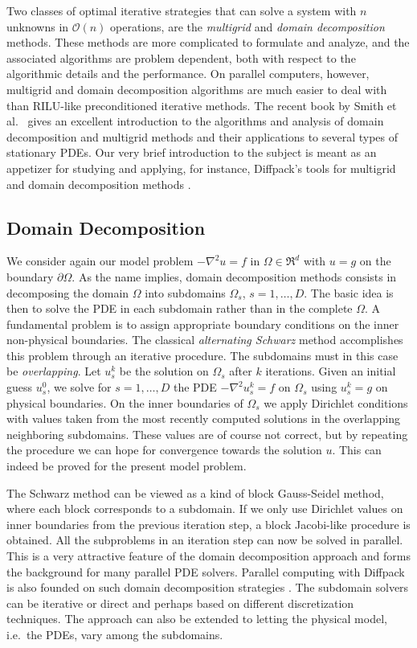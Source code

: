 Two classes of optimal iterative strategies that can solve a system with
$n$ unknowns in $\mathcal{O}(n)$ operations, are the \emph{multigrid}
and \emph{domain decomposition}
methods.
These methods are more complicated to formulate and analyze, and the
associated algorithms are problem dependent, both with respect to
the algorithmic details and the performance.
On parallel computers, however, multigrid and domain decomposition
algorithms are much easier to deal with than RILU-like preconditioned
iterative methods.
The recent book by Smith et al.~\cite{SmithBjorstadGropp96} gives
an excellent introduction to the algorithms and analysis of
domain decomposition and multigrid methods and their applications
to several types of stationary PDEs.
Our very brief introduction to the subject is meant as an appetizer for
studying \cite{SmithBjorstadGropp96} and applying, for instance, Diffpack's tools for
multigrid and domain decomposition methods \cite{DD9}.

\subsection{Domain Decomposition}
We consider again our model problem $-\nabla^2u =f$ in $\Omega\in\Re^d$
with $u=g$ on the boundary $\partial\Omega$.
As the name implies, domain decomposition methods consists in decomposing
the domain $\Omega$ into subdomains $\Omega_s$, $s=1,\ldots,D$.
The basic idea is then to solve the PDE in each subdomain rather than in
the complete $\Omega$. A fundamental problem is to assign appropriate
boundary conditions on the inner non-physical boundaries.
The classical \emph{alternating Schwarz} method accomplishes this problem
through an iterative procedure.
The subdomains must in this case be
\emph{overlapping}.
Let $u_s^k$ be the solution on
$\Omega_s$ after $k$ iterations.
Given an initial guess $u^0_s$, we solve for $s=1,\ldots,D$ the
PDE $-\nabla^2u_s^k=f$  on $\Omega_s$ using $u_s^k=g$ on physical
boundaries. On the inner boundaries of $\Omega_s$ we apply Dirichlet
conditions with values taken from the most recently computed solutions
in the overlapping neighboring subdomains.
These values are of course not correct, but by repeating the procedure
we can hope for convergence towards the solution $u$.
This can indeed be proved for the present model problem.

The Schwarz method can be viewed
as a kind of block Gauss-Seidel method, where each block corresponds to
a subdomain. If we only use Dirichlet values on inner boundaries from
the previous iteration step, a block Jacobi-like procedure is obtained.
All the subproblems in an iteration step can now be solved in parallel.
This is a very attractive feature of the domain decomposition approach
and forms the background for many parallel PDE solvers.
Parallel computing with Diffpack is also founded on such domain
decomposition strategies \cite{DPparallel}.
The subdomain solvers can be iterative or direct and perhaps based
on different discretization techniques. The approach can also be extended
to letting the physical model, i.e.~the PDEs, vary among the subdomains.

